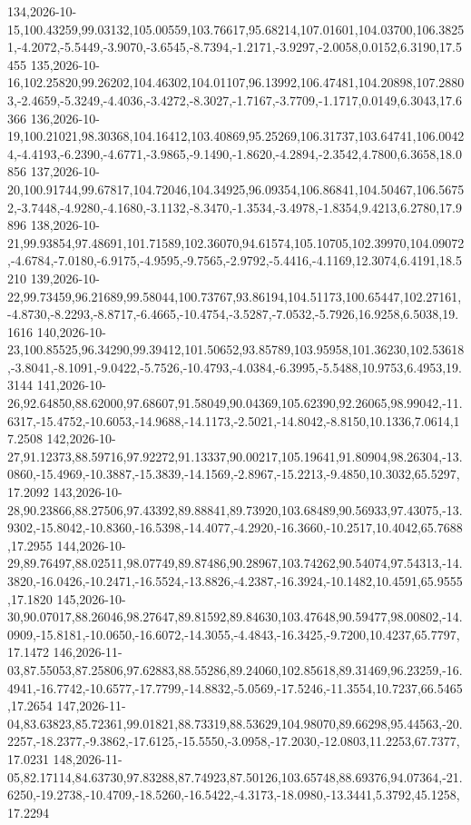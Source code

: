 \documentclass{eic-bcc-tcc}
\begin{document}
{134,2026-10-15,100.43259,99.03132,105.00559,103.76617,95.68214,107.01601,104.03700,106.38251,-4.2072,-5.5449,-3.9070,-3.6545,-8.7394,-1.2171,-3.9297,-2.0058,0.0152,6.3190,17.5455
135,2026-10-16,102.25820,99.26202,104.46302,104.01107,96.13992,106.47481,104.20898,107.28803,-2.4659,-5.3249,-4.4036,-3.4272,-8.3027,-1.7167,-3.7709,-1.1717,0.0149,6.3043,17.6366
136,2026-10-19,100.21021,98.30368,104.16412,103.40869,95.25269,106.31737,103.64741,106.00424,-4.4193,-6.2390,-4.6771,-3.9865,-9.1490,-1.8620,-4.2894,-2.3542,4.7800,6.3658,18.0856
137,2026-10-20,100.91744,99.67817,104.72046,104.34925,96.09354,106.86841,104.50467,106.56752,-3.7448,-4.9280,-4.1680,-3.1132,-8.3470,-1.3534,-3.4978,-1.8354,9.4213,6.2780,17.9896
138,2026-10-21,99.93854,97.48691,101.71589,102.36070,94.61574,105.10705,102.39970,104.09072,-4.6784,-7.0180,-6.9175,-4.9595,-9.7565,-2.9792,-5.4416,-4.1169,12.3074,6.4191,18.5210
139,2026-10-22,99.73459,96.21689,99.58044,100.73767,93.86194,104.51173,100.65447,102.27161,-4.8730,-8.2293,-8.8717,-6.4665,-10.4754,-3.5287,-7.0532,-5.7926,16.9258,6.5038,19.1616
140,2026-10-23,100.85525,96.34290,99.39412,101.50652,93.85789,103.95958,101.36230,102.53618,-3.8041,-8.1091,-9.0422,-5.7526,-10.4793,-4.0384,-6.3995,-5.5488,10.9753,6.4953,19.3144
141,2026-10-26,92.64850,88.62000,97.68607,91.58049,90.04369,105.62390,92.26065,98.99042,-11.6317,-15.4752,-10.6053,-14.9688,-14.1173,-2.5021,-14.8042,-8.8150,10.1336,7.0614,17.2508
142,2026-10-27,91.12373,88.59716,97.92272,91.13337,90.00217,105.19641,91.80904,98.26304,-13.0860,-15.4969,-10.3887,-15.3839,-14.1569,-2.8967,-15.2213,-9.4850,10.3032,65.5297,17.2092
143,2026-10-28,90.23866,88.27506,97.43392,89.88841,89.73920,103.68489,90.56933,97.43075,-13.9302,-15.8042,-10.8360,-16.5398,-14.4077,-4.2920,-16.3660,-10.2517,10.4042,65.7688,17.2955
144,2026-10-29,89.76497,88.02511,98.07749,89.87486,90.28967,103.74262,90.54074,97.54313,-14.3820,-16.0426,-10.2471,-16.5524,-13.8826,-4.2387,-16.3924,-10.1482,10.4591,65.9555,17.1820
145,2026-10-30,90.07017,88.26046,98.27647,89.81592,89.84630,103.47648,90.59477,98.00802,-14.0909,-15.8181,-10.0650,-16.6072,-14.3055,-4.4843,-16.3425,-9.7200,10.4237,65.7797,17.1472
146,2026-11-03,87.55053,87.25806,97.62883,88.55286,89.24060,102.85618,89.31469,96.23259,-16.4941,-16.7742,-10.6577,-17.7799,-14.8832,-5.0569,-17.5246,-11.3554,10.7237,66.5465,17.2654
147,2026-11-04,83.63823,85.72361,99.01821,88.73319,88.53629,104.98070,89.66298,95.44563,-20.2257,-18.2377,-9.3862,-17.6125,-15.5550,-3.0958,-17.2030,-12.0803,11.2253,67.7377,17.0231
148,2026-11-05,82.17114,84.63730,97.83288,87.74923,87.50126,103.65748,88.69376,94.07364,-21.6250,-19.2738,-10.4709,-18.5260,-16.5422,-4.3173,-18.0980,-13.3441,5.3792,45.1258,17.2294
}
\end{document}
